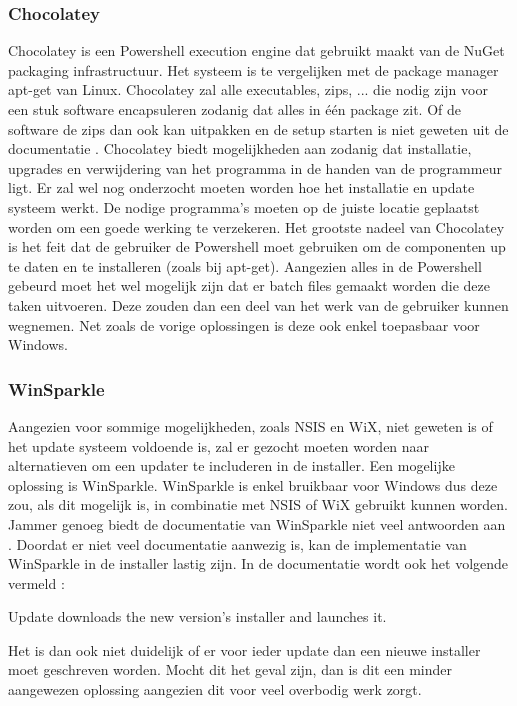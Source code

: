 \documentclass{article}
\begin{document}
\subsubsection{Chocolatey \citep{chocoMain}}
Chocolatey is een Powershell execution engine dat gebruikt maakt van de NuGet packaging infrastructuur.
Het systeem is te vergelijken met de package manager apt-get van Linux.
Chocolatey zal alle executables, zips, ... die nodig zijn voor een stuk software encapsuleren zodanig dat alles in \'e\'en package zit.
Of de software de zips dan ook kan uitpakken en de setup starten is niet geweten uit de documentatie \citep{chocoDoc}.
Chocolatey biedt mogelijkheden aan zodanig dat installatie, upgrades en verwijdering van het programma in de handen van de programmeur ligt.
Er zal wel nog onderzocht moeten worden hoe het installatie en update systeem werkt.
De nodige programma's moeten op de juiste locatie geplaatst worden om een goede werking te verzekeren.
Het grootste nadeel van Chocolatey is het feit dat de gebruiker de Powershell moet gebruiken om de componenten up te daten en te installeren (zoals bij apt-get).
Aangezien alles in de Powershell gebeurd moet het wel mogelijk zijn dat er batch files gemaakt worden die deze taken uitvoeren.
Deze zouden dan een deel van het werk van de gebruiker kunnen wegnemen.
Net zoals de vorige oplossingen is deze ook enkel toepasbaar voor Windows.

\subsubsection{WinSparkle \citep{winsparkleMain}}
Aangezien voor sommige mogelijkheden, zoals NSIS en WiX, niet geweten is of het update systeem voldoende is, zal er gezocht moeten worden naar alternatieven om een updater te includeren in de installer.
Een mogelijke oplossing is WinSparkle.
WinSparkle is enkel bruikbaar voor Windows dus deze zou, als dit mogelijk is, in combinatie met NSIS of WiX gebruikt kunnen worden.
Jammer genoeg biedt de documentatie van WinSparkle niet veel antwoorden aan  \citep{winsparkleDoc}.
Doordat er niet veel documentatie aanwezig is, kan de implementatie van WinSparkle in de installer lastig zijn.
In de documentatie wordt ook het volgende vermeld \citep{winsparkleDocUser}:

\begin{displayquote}
Update downloads the new version's installer and launches it.
\end{displayquote}

Het is dan ook niet duidelijk of er voor ieder update dan een nieuwe installer moet geschreven worden.
Mocht dit het geval zijn, dan is dit een minder aangewezen oplossing aangezien dit voor veel overbodig werk zorgt.
\end{document}
